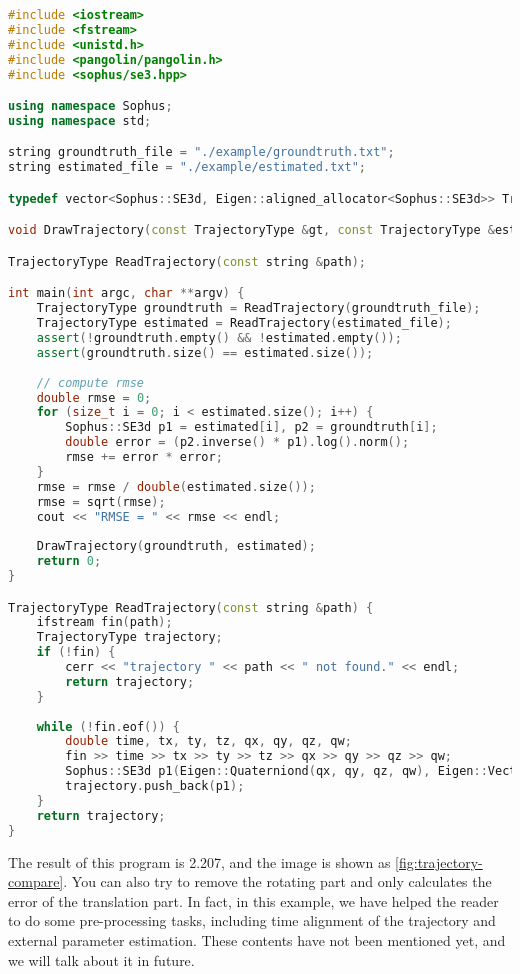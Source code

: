 \begin{lstlisting}[language=c++,caption=slambook/ch4/example/trajectoryError.cpp]
#include <iostream>
#include <fstream>
#include <unistd.h>
#include <pangolin/pangolin.h>
#include <sophus/se3.hpp>

using namespace Sophus;
using namespace std;

string groundtruth_file = "./example/groundtruth.txt";
string estimated_file = "./example/estimated.txt";

typedef vector<Sophus::SE3d, Eigen::aligned_allocator<Sophus::SE3d>> TrajectoryType;

void DrawTrajectory(const TrajectoryType &gt, const TrajectoryType &esti);

TrajectoryType ReadTrajectory(const string &path);

int main(int argc, char **argv) {
    TrajectoryType groundtruth = ReadTrajectory(groundtruth_file);
    TrajectoryType estimated = ReadTrajectory(estimated_file);
    assert(!groundtruth.empty() && !estimated.empty());
    assert(groundtruth.size() == estimated.size());
    
    // compute rmse
    double rmse = 0;
    for (size_t i = 0; i < estimated.size(); i++) {
        Sophus::SE3d p1 = estimated[i], p2 = groundtruth[i];
        double error = (p2.inverse() * p1).log().norm();
        rmse += error * error;
    }
    rmse = rmse / double(estimated.size());
    rmse = sqrt(rmse);
    cout << "RMSE = " << rmse << endl;
    
    DrawTrajectory(groundtruth, estimated);
    return 0;
}

TrajectoryType ReadTrajectory(const string &path) {
    ifstream fin(path);
    TrajectoryType trajectory;
    if (!fin) {
        cerr << "trajectory " << path << " not found." << endl;
        return trajectory;
    }
    
    while (!fin.eof()) {
        double time, tx, ty, tz, qx, qy, qz, qw;
        fin >> time >> tx >> ty >> tz >> qx >> qy >> qz >> qw;
        Sophus::SE3d p1(Eigen::Quaterniond(qx, qy, qz, qw), Eigen::Vector3d(tx, ty, tz));
        trajectory.push_back(p1);
    }
    return trajectory;
}
\end{lstlisting}

The result of this program is 2.207, and the image is shown as \autoref{fig:trajectory-compare}. You can also try to remove the rotating part and only calculates the error of the translation part. In fact, in this example, we have helped the reader to do some pre-processing tasks, including time alignment of the trajectory and external parameter estimation. These contents have not been mentioned yet, and we will talk about it in future.


